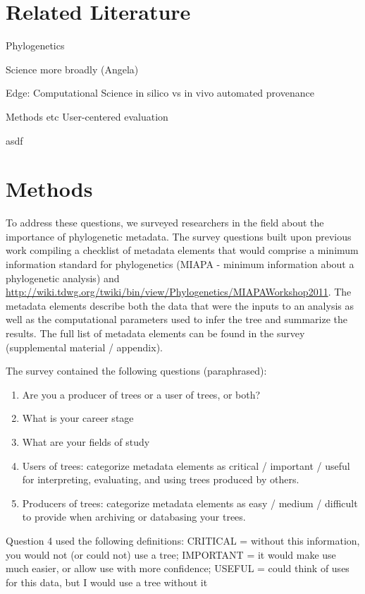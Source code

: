 \documentclass[12pt]{scrartcl}
\begin{document}
\begin{multicols}{2}
\section{Related Literature}

Phylogenetics

Science more broadly (Angela)

Edge: Computational Science
in silico vs in vivo
automated provenance

Methods etc
User-centered evaluation

\begin{compactitem}
  \item asdf
\end{compactitem}

\section{Methods}
To address these questions, we surveyed researchers in the field about the importance of phylogenetic metadata. The survey questions built upon previous work compiling a checklist of metadata elements that would comprise a minimum information standard for phylogenetics (MIAPA - minimum information about a phylogenetic analysis) \citep{Leebens-Mack2006} and \url{http://wiki.tdwg.org/twiki/bin/view/Phylogenetics/MIAPAWorkshop2011}. The metadata elements describe both the data that were the inputs to an analysis as well as the computational parameters used to infer the tree and summarize the results. The full list of metadata elements can be found in the survey (supplemental material / appendix). 

The survey contained the following questions (paraphrased):

\begin{enumerate}
\item{Are you a producer of trees or a user of trees, or both?}
\item{What is your career stage}
\item{What are your fields of study}
\item{Users of trees: categorize metadata elements as critical / important / useful for interpreting, evaluating, and using trees produced by others. }
\item{Producers of trees: categorize metadata elements as easy / medium / difficult to provide when archiving or databasing your trees. }
\end{enumerate}

Question 4 used the following definitions: CRITICAL = without this information, you would not (or could not) use a tree; IMPORTANT = it would make use much easier, or allow use with more confidence; USEFUL = could think of uses for this data, but I would use a tree without it


\end{multicols}
\end{document}
